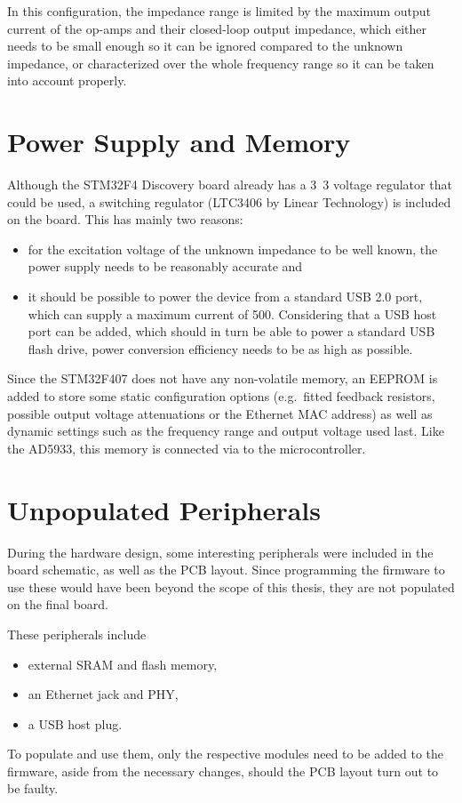 In this configuration, the impedance range is limited by the maximum output current of the
op-amps and their closed-loop output impedance, which either needs to be small enough so it can be ignored compared
to the unknown impedance, or characterized over the whole frequency range so it can be taken into account properly.


\section{Power Supply and Memory}

Although the STM32F4 Discovery board already has a \unit{3.3}{\volt} voltage regulator that could be used, a
switching regulator (LTC3406 by Linear Technology) is included on the board. This has mainly two reasons:
\begin{itemize}
	\item for the excitation voltage of the unknown impedance to be well known, the power supply needs to be
    reasonably accurate and
  \item it should be possible to power the device from a standard USB 2.0 port, which can supply a maximum current of
    \unit{500}{\milli\ampere}. Considering that a USB host port can be added, which should in turn be able to power
    a standard USB flash drive, power conversion efficiency needs to be as high as possible. 
\end{itemize}

Since the STM32F407 does not have any non-volatile memory, an EEPROM is added to store some static configuration
options (e.g.\ fitted feedback resistors, possible output voltage attenuations or the Ethernet MAC address) as well as
dynamic settings such as the frequency range and output voltage used last. Like the AD5933, this memory is connected
via \iic{} to the microcontroller.


\section{Unpopulated Peripherals}

During the hardware design, some interesting peripherals were included in the board schematic, as well as the PCB
layout. Since programming the firmware to use these would have been beyond the scope of this thesis, they are not
populated on the final board.

These peripherals include
\begin{itemize}
  \item external SRAM and flash memory,
	\item an Ethernet jack and PHY,
  \item a USB host plug.
\end{itemize}
To populate and use them, only the respective modules need to be added to the firmware, aside from the necessary
changes, should the PCB layout turn out to be faulty.
